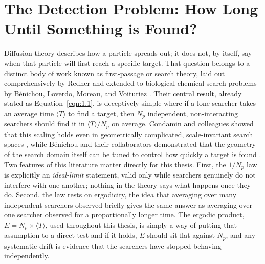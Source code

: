 \section{The Detection Problem: How Long Until Something is Found?}
\label{sec:2.3}
Diffusion theory describes how a particle spreads out; it does not, by itself, say when that particle will first reach a specific target. That question belongs to a distinct body of work known as first-passage or search theory, laid out comprehensively by Redner \cite{Redner2001} and extended to biological chemical search problems by B\'enichou, Loverdo, Moreau, and Voituriez \cite{Loverdo2008, Benichou2011}. Their central result, already stated as Equation~\ref{eqn:1.1}, is deceptively simple where if a lone searcher takes an average time $\langle T \rangle$ to find a target, then $N_p$ independent, non-interacting searchers should find it in $\langle T \rangle / N_p$ on average. Condamin and colleagues showed that this scaling holds even in geometrically complicated, scale-invariant search spaces \cite{Condamin2007}, while B\'enichou and their collaborators demonstrated that the geometry of the search domain itself can be tuned to control how quickly a target is found \cite{Benichou2010}. Two features of this literature matter directly for this thesis. First, the $1/N_p$ law is explicitly an \emph{ideal-limit} statement, valid only while searchers genuinely do not interfere with one another; nothing in the theory says what happens once they do. Second, the law rests on ergodicity, the idea that averaging over many independent searchers observed briefly gives the same answer as averaging over one searcher observed for a proportionally longer time. The ergodic product, $E = N_p \times \langle T \rangle$, used throughout this thesis, is simply a way of putting that assumption to a direct test and if it holds, $E$ should sit flat against $N_p$, and any systematic drift is evidence that the searchers have stopped behaving independently.

